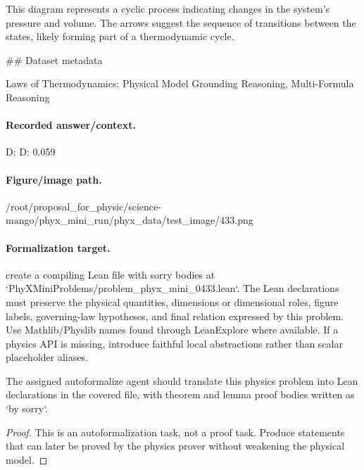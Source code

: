 This diagram represents a cyclic process indicating changes in the system's pressure and volume. The arrows suggest the sequence of transitions between the states, likely forming part of a thermodynamic cycle.

\#\# Dataset metadata

Laws of Thermodynamics; Physical Model Grounding Reasoning, Multi-Formula Reasoning

\paragraph{Recorded answer/context.}
D: D: 0.059

\paragraph{Figure/image path.}
/root/proposal\_for\_physic/science-mango/phyx\_mini\_run/phyx\_data/test\_image/433.png

\paragraph{Formalization target.}
create a compiling Lean file with sorry bodies at `PhyXMiniProblems/problem\_phyx\_mini\_0433.lean`. The Lean declarations must preserve the physical quantities, dimensions or dimensional roles, figure labels, governing-law hypotheses, and final relation expressed by this problem.
Use Mathlib/Physlib names found through LeanExplore where available. If a physics API is missing, introduce faithful local abstractions rather than scalar placeholder aliases.

\begin{theorem}
\label{thm:physics:phyx_mini_0433:target}
The assigned autoformalize agent should translate this physics problem into Lean declarations in the covered file, with theorem and lemma proof bodies written as `by sorry`.
\end{theorem}
\begin{proof}
This is an autoformalization task, not a proof task. Produce statements that can later be proved by the physics prover without weakening the physical model.
\end{proof}

